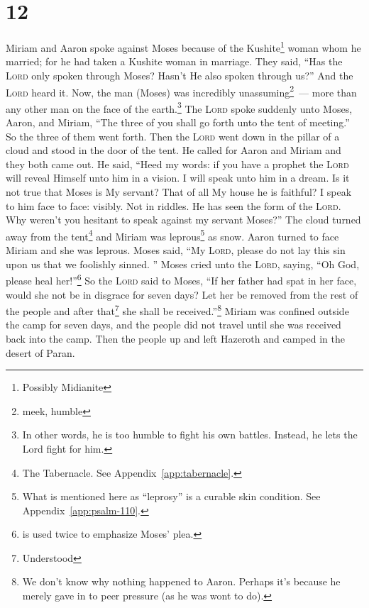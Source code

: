 \section{12}\label{Numbers 12}
\begin{enumerate}[align=center]
     Miriam and Aaron spoke against Moses because of the Kushite\footnote{Possibly Midianite} woman whom he married; for he had taken a Kushite woman in marriage.%
     They said, ``Has the \textsc{Lord} only spoken through Moses? Hasn't He also spoken through us?'' And the \textsc{Lord} heard it.%
     Now, the man (Moses) was incredibly unassuming\footnote{meek, humble}~--- more than any other man on the face of the earth.\footnote{In other words, he is too humble to fight his own battles. Instead, he lets the Lord fight for him.}%
     The \textsc{Lord} spoke suddenly unto Moses, Aaron, and Miriam, ``The three of you shall go forth unto the tent of meeting.'' So the three of them went forth.%
     Then the \textsc{Lord} went down in the pillar of a cloud and stood in the door of the tent. He called for Aaron and Miriam and they both came out.%
     He said, ``Heed my words: if you have a prophet the \textsc{Lord} will reveal Himself unto him in a vision. I will speak unto him in a dream.%
     Is it not true that Moses is My servant? That of all My house he is faithful?%
     I speak to him face to face: visibly. Not in riddles. He has seen the form of the \textsc{Lord}. Why weren't you hesitant to speak against my servant Moses?''%
     The cloud turned away from the tent\footnote{The Tabernacle. See Appendix~\ref{app:tabernacle}.} and Miriam was leprous\footnote{What is mentioned here as ``leprosy'' is a curable skin condition. See Appendix~\ref{app:psalm-110}.} as snow. Aaron turned to face Miriam and she was leprous.
     Moses said, ``My \textsc{Lord}, please do not lay this sin upon us that we foolishly sinned.%
     ''%
     Moses cried unto the \textsc{Lord}, saying, ``Oh God, please heal her!''\footnote{ is used twice to emphasize Moses' plea.}%
     So the \textsc{Lord} said to Moses, ``If her father had spat in her face, would she not be in disgrace for seven days? Let her be removed from the rest of the people and after that\footnote{Understood} she shall be received.''\footnote{We don't know why nothing happened to Aaron. Perhaps it's because he merely gave in to peer pressure (as he was wont to do).}%
     Miriam was confined outside the camp for seven days, and the people did not travel until she was received back into the camp.%
     Then the people up and left Hazeroth and camped in the desert of Paran.%
\end{enumerate}
